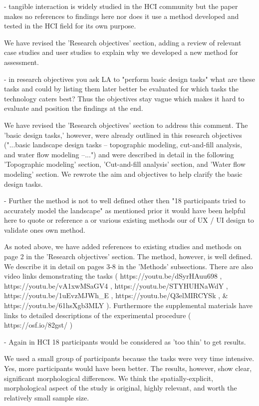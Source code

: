 - tangible interaction is widely studied in the HCI community but the paper makes no references to findings here nor does it use a method developed and tested in the HCI field for its own purpose.

We have revised the 'Research objectives' section, adding a review of relevant case studies and user studies to explain why we developed a new method for assessment. 

- in research objectives you ask LA to "perform basic design tasks" what are these tasks and could by listing them later better be evaluated for which tasks the technology caters best? Thus the objectives stay vague which makes it hard to evaluate and position the findings at the end.

We have revised the 'Research objectives' section to address this comment. The 'basic design tasks,' however, were already outlined in this research objectives ("...basic landscape design tasks -- topographic modeling, cut-and-fill analysis, and water flow modeling --...") and were described in detail in the following 'Topographic modeling' section, 'Cut-and-fill analysis' section, and 'Water flow modeling' section. 
We rewrote the aim and objectives to help clarify the basic design tasks. 

- Further the method is not to well defined other then "18 participants tried to accurately model the landscape" as mentioned prior it would have been helpful here to quote or reference a or various existing methods our of UX / UI design to validate ones own method.

As noted above, we have added references to existing studies and methods on page 2 in the 'Research objectives' section. The method, however, is well defined. We describe it in detail on pages 3-8 in the 'Methods' subsections. There are also video links demonstrating the tasks ( https://youtu.be/dSyrHAuu698 , https://youtu.be/vA1xwMSaGV4 , https://youtu.be/STYHUHNaWdY , https://youtu.be/1uEvzMJWh_E , https://youtu.be/Q3elMIRCYSk , & https://youtu.be/61hsXgb3MLY ). Furthermore the supplemental materials have links to detailed descriptions of the experimental procedure ( https://osf.io/82gst/ )

- Again in HCI 18 participants would be considered as 'too thin' to get results.

We used a small group of participants because the tasks were very time intensive. 
Yes, more participants would have been better. 
The results, however, show clear, significant morphological differences.
We think the spatially-explicit, morphological aspect of the study is original, highly relevant, and worth the relatively small sample size. 

